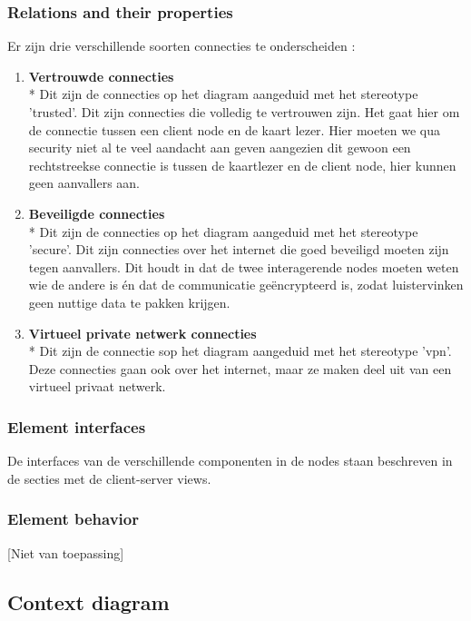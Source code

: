 \documentclass[a4paper,10pt]{article}
\begin{document}
\subsubsection{Relations and their properties}
\label{subsubsec:relations_deployment}
Er zijn drie verschillende soorten connecties te onderscheiden : 
\begin{enumerate}
 \item \textbf{Vertrouwde connecties}\\*
Dit zijn de connecties op het diagram aangeduid met het stereotype 'trusted'. Dit zijn connecties die volledig te vertrouwen zijn. Het gaat hier om de connectie tussen een client node en de kaart lezer. Hier moeten we qua security niet al te veel aandacht aan geven aangezien dit gewoon een rechtstreekse connectie is tussen de kaartlezer en de client node, hier kunnen geen aanvallers aan. 
\item \textbf{Beveiligde connecties}\\*
Dit zijn de connecties op het diagram aangeduid met het stereotype 'secure'. Dit zijn connecties over het internet die goed beveiligd moeten zijn tegen aanvallers. Dit houdt in dat de twee interagerende nodes moeten weten wie de andere is én dat de communicatie geëncrypteerd is, zodat luistervinken geen nuttige data te pakken krijgen.
\item \textbf{Virtueel private netwerk connecties}\\*
Dit zijn de connectie sop het diagram aangeduid met het stereotype 'vpn'. Deze connecties gaan ook over het internet, maar ze maken deel uit van een virtueel privaat netwerk.
\end{enumerate}

\subsubsection{Element interfaces}

De interfaces van de verschillende componenten in de nodes staan beschreven in de secties met de client-server views.

\subsubsection{Element behavior}
[Niet van toepassing]

\clearpage
\subsection{Context diagram}
\end{document}
